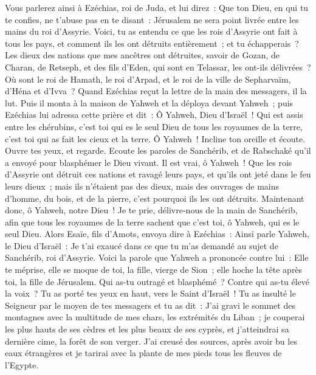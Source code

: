\begin{multicols}{2}
Vous parlerez ainsi à Ezéchias, roi de Juda, et lui direz~: Que ton Dieu, en qui tu te confies, ne t'abuse pas en te disant~: Jérusalem ne sera point livrée entre les mains du roi d'Assyrie.
Voici, tu as entendu ce que les rois d'Assyrie ont fait à tous les pays, et comment ils les ont détruits entièrement~; et tu échapperais~?
Les dieux des nations que mes ancêtres ont détruites, savoir de Gozan, de Charan, de Retseph, et des fils d'Eden, qui sont en Telassar, les ont-ils délivrées~?
Où sont le roi de Hamath, le roi d'Arpad, et le roi de la ville de Sepharvaïm, d'Héna et d'Ivva~?
Quand Ezéchias reçut la lettre de la main des messagers, il la lut. Puis il monta à la maison de Yahweh et la déploya devant Yahweh~;
puis Ezéchias lui adressa cette prière et dit~: Ô Yahweh, Dieu d'Israël~! Qui est assis entre les chérubins, c'est toi qui es le seul Dieu de tous les royaumes de la terre, c'est toi qui as fait les cieux et la terre.
Ô Yahweh~! Incline ton oreille et écoute. Ouvre tes yeux, et regarde. Ecoute les paroles de Sanchérib, et de Rabschaké qu'il a envoyé pour blasphémer le Dieu vivant.
Il est vrai, ô Yahweh~! Que les rois d'Assyrie ont détruit ces nations et ravagé leurs pays,
et qu'ils ont jeté dans le feu leurs dieux~; mais ils n'étaient pas des dieux, mais des ouvrages de mains d'homme, du bois, et de la pierre, c'est pourquoi ils les ont détruits.
Maintenant donc, ô Yahweh, notre Dieu~! Je te prie, délivre-nous de la main de Sanchérib, afin que tous les royaumes de la terre sachent que c'est toi, ô Yahweh, qui es le seul Dieu.
Alors Esaïe, fils d'Amots, envoya dire à Ezéchias~: Ainsi parle Yahweh, le Dieu d'Israël~: Je t'ai exaucé dans ce que tu m'as demandé au sujet de Sanchérib, roi d'Assyrie.
Voici la parole que Yahweh a prononcée contre lui~: Elle te méprise, elle se moque de toi, la fille, vierge de Sion~; elle hoche la tête après toi, la fille de Jérusalem.
Qui as-tu outragé et blasphémé~? Contre qui as-tu élevé la voix~? Tu as porté tes yeux en haut, vers le Saint d'Israël~!
Tu as insulté le Seigneur par le moyen de tes messagers et tu as dit~: J'ai gravi le sommet des montagnes avec la multitude de mes chars, les extrémités du Liban~; je couperai les plus hauts de ses cèdres et les plus beaux de ses cyprès, et j'atteindrai sa dernière cime, la forêt de son verger.
J'ai creusé des sources, après avoir bu les eaux étrangères et je tarirai avec la plante de mes pieds tous les fleuves de l'Egypte.

\end{multicols}
